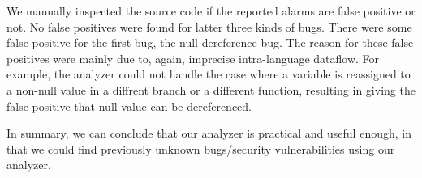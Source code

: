 We manually inspected the source code if the reported alarms are false positive
or not. No false positives were found for latter three kinds of bugs.  There
were some false positive for the first bug, the null dereference bug. The
reason for these false positives were mainly due to, again, imprecise
intra-language dataflow. For example, the analyzer could not handle the case
where a variable is reassigned to a non-null value in a diffrent branch or a
different function, resulting in giving the false positive that null value can
be dereferenced.

In summary, we can conclude that our analyzer is practical and useful enough,
in that we could find previously unknown bugs/security vulnerabilities using
our analyzer.
